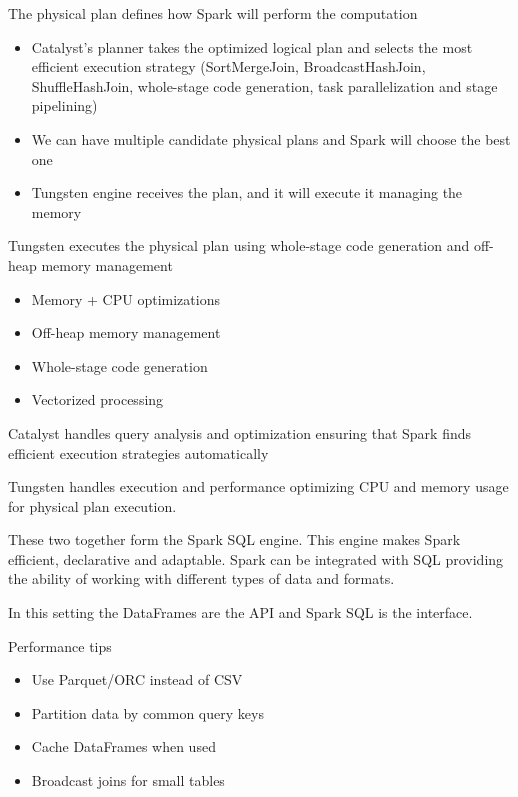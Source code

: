 The physical plan defines how Spark will perform the computation
\begin{itemize}
    \item Catalyst's planner takes the optimized logical plan and selects the most efficient execution strategy (SortMergeJoin, BroadcastHashJoin, ShuffleHashJoin, whole-stage code generation, task parallelization and stage pipelining)
    \item We can have multiple candidate physical plans and Spark will choose the best one
    \item Tungsten engine receives the plan, and it will execute it managing the memory 
\end{itemize}

Tungsten executes the physical plan using whole-stage code generation and off-heap memory management

\begin{itemize}
    \item Memory + CPU optimizations
    \item Off-heap memory management
    \item Whole-stage code generation
    \item Vectorized processing
\end{itemize}

Catalyst \ra handles query analysis and optimization ensuring that Spark finds efficient execution strategies automatically

\vspace{10pt}

Tungsten \ra handles execution and performance optimizing CPU and memory usage for physical plan execution.

\vspace{10pt}

These two together form the Spark SQL engine. This engine makes Spark efficient, declarative and adaptable. Spark can be integrated with SQL providing the ability of working with different types of data and formats.

\vspace{10pt}

In this setting the DataFrames are the API and Spark SQL is the interface.

\vspace{10pt}

Performance tips

\begin{itemize}
    \item Use Parquet/ORC instead of CSV
    \item Partition data by common query keys
    \item Cache DataFrames when used
    \item Broadcast joins for small tables
\end{itemize}


